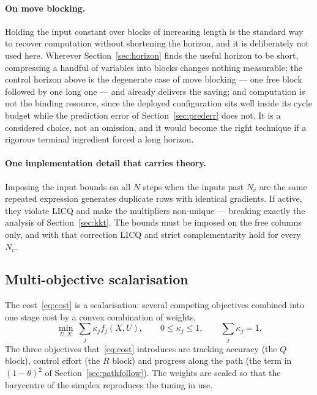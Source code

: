 \documentclass[11pt,a4paper]{article}
\newcommand{\Ninput}{N_c}
\begin{document}
\paragraph{On move blocking.} Holding the input constant over blocks of increasing length is the standard way
to recover computation without shortening the horizon, and it is deliberately not used here. Wherever
Section~\ref{sec:horizon} finds the useful horizon to be short, compressing a handful of variables into
blocks changes nothing measurable; the control horizon above is the degenerate case of move blocking --- one
free block followed by one long one --- and already delivers the saving; and computation is not the binding
resource, since the deployed configuration sits well inside its cycle budget while the prediction error of
Section~\ref{sec:prederr} does not. It is a considered choice, not an omission, and it would become the right
technique if a rigorous terminal ingredient forced a long horizon.

\paragraph{One implementation detail that carries theory.} Imposing the input bounds on all $N$ steps when
the inputs past $\Ninput$ are the same repeated expression generates duplicate rows with identical gradients.
If active, they violate LICQ and make the multipliers non-unique --- breaking exactly the analysis of
Section~\ref{sec:kkt}. The bounds must be imposed on the free columns only, and with that correction LICQ and
strict complementarity hold for every $\Ninput$.

\subsection{Multi-objective scalarisation}
\label{sec:pareto}

The cost~\eqref{eq:cost} is a scalarisation: several competing objectives combined into one stage cost by a
convex combination of weights,
\begin{equation}
  \min_{U,X}\ \sum_{j} \kappa_j f_j(X,U),
  \qquad 0\le\kappa_j\le1,\qquad \sum_j \kappa_j = 1 .
  \label{eq:scalar}
\end{equation}
The three objectives that~\eqref{eq:cost} introduces are tracking accuracy (the $Q$ block), control effort
(the $R$ block) and progress along the path (the term in $(1-\theta)^2$ of Section~\ref{sec:pathfollow}). The
weights are scaled so that the barycentre of the simplex reproduces the tuning in use.
\end{document}
